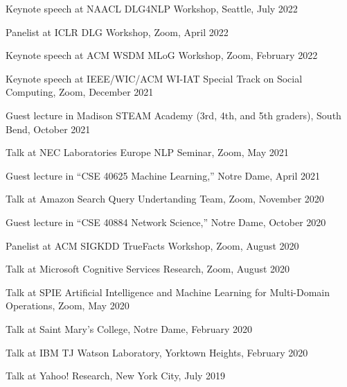 \documentclass[10pt]{article}
\newenvironment{myindentpar}[1]%
{\begin{list}{}%
         {\setlength{\leftmargin}{#1}}%
         \item[]%
}
{\end{list}}
\newcounter{list}
\begin{document}
\begin{myindentpar}{0.75cm}
\hspace{-0.75cm} Keynote speech at NAACL DLG4NLP Workshop, Seattle, July 2022
	
\hspace{-0.75cm} Panelist at ICLR DLG Workshop, Zoom, April 2022
	
\hspace{-0.75cm} Keynote speech at ACM WSDM MLoG Workshop, Zoom, February 2022
	
\hspace{-0.75cm} Keynote speech at IEEE/WIC/ACM WI-IAT Special Track on Social Computing, Zoom, December 2021
	
\hspace{-0.75cm} Guest lecture in Madison STEAM Academy (3rd, 4th, and 5th graders), South Bend, October 2021
	
\hspace{-0.75cm} Talk at NEC Laboratories Europe NLP Seminar, Zoom, May 2021
	
\hspace{-0.75cm} Guest lecture in ``CSE 40625 Machine Learning,'' Notre Dame, April 2021
	
\hspace{-0.75cm} Talk at Amazon Search Query Undertanding Team, Zoom, November 2020

\hspace{-0.75cm} Guest lecture in ``CSE 40884 Network Science,'' Notre Dame, October 2020

\hspace{-0.75cm} Panelist at ACM SIGKDD TrueFacts Workshop, Zoom, August 2020
	
\hspace{-0.75cm} Talk at Microsoft Cognitive Services Research, Zoom, August 2020
	
\hspace{-0.75cm} Talk at SPIE Artificial Intelligence and Machine Learning for Multi-Domain Operations, Zoom, May 2020
	
\hspace{-0.75cm} Talk at Saint Mary's College, Notre Dame, February 2020
	
\hspace{-0.75cm} Talk at IBM TJ Watson Laboratory, Yorktown Heights, February 2020
	
\hspace{-0.75cm} Talk at Yahoo! Research, New York City, July 2019

\end{myindentpar}
\end{document}
